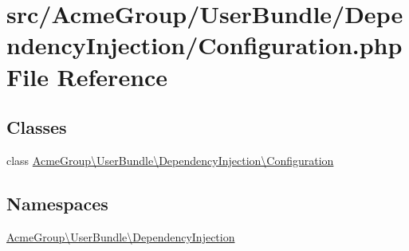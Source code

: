 \hypertarget{_user_bundle_2_dependency_injection_2_configuration_8php}{\section{src/\+Acme\+Group/\+User\+Bundle/\+Dependency\+Injection/\+Configuration.php File Reference}
\label{_user_bundle_2_dependency_injection_2_configuration_8php}
}
\subsection*{Classes}
\begin{DoxyCompactItemize}
\item 
class \hyperlink{class_acme_group_1_1_user_bundle_1_1_dependency_injection_1_1_configuration}{Acme\+Group\textbackslash{}\+User\+Bundle\textbackslash{}\+Dependency\+Injection\textbackslash{}\+Configuration}
\end{DoxyCompactItemize}
\subsection*{Namespaces}
\begin{DoxyCompactItemize}
\item 
 \hyperlink{namespace_acme_group_1_1_user_bundle_1_1_dependency_injection}{Acme\+Group\textbackslash{}\+User\+Bundle\textbackslash{}\+Dependency\+Injection}
\end{DoxyCompactItemize}

